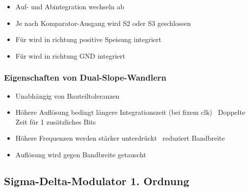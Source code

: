 \begin{minipage}[t]{0.48\columnwidth}
    \begin{itemize}
        \item Auf- und Abintegration wechseln ab
        \item Je nach Komparator-Ausgang wird S2 oder S3 geschlossen
    \end{itemize}
\end{minipage}
\hfill
\begin{minipage}[t]{0.48\columnwidth}
    \begin{itemize}
        \item Für  wird in richtung positive Speisung integriert
        \item Für  wird in richtung GND integriert
    \end{itemize}
\end{minipage}


\subsubsection{Eigenschaften von Dual-Slope-Wandlern}

\begin{minipage}[t]{0.48\columnwidth}
    \begin{itemize}
        \item Unabhängig von Bauteiltoleranzen
        \item Höhere Auflösung bedingt längere Integrationszeit (bei fixem clk) 
            \textrightarrow\ Doppelte Zeit für 1 zusätzliches Bits
    \end{itemize}
\end{minipage}
\hfill
\begin{minipage}[t]{0.48\columnwidth}
    \begin{itemize}
        \item Höhere Frequenzen werden stärker unterdrückt \textrightarrow\ reduziert Bandbreite
        \item Auflösung wird gegen Bandbreite getauscht
    \end{itemize}
\end{minipage}


\subsection{Sigma-Delta-Modulator 1. Ordnung}

